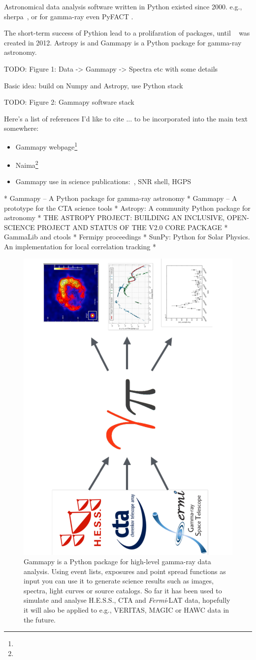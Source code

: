 Astronomical data analysis software written in Python existed since 2000. e.g.,
sherpa~\citep{sherpa-2011, sherpa-2009}, or for gamma-ray even PyFACT
\citep{pyfact}.

The short-term success of Pythion lead to a prolifaration of packages, until
\astropy~\citep{astropy} was created in 2012. Astropy is and Gammapy is a
Python package for gamma-ray astronomy.



TODO: Figure 1: Data -> Gammapy -> Spectra etc with some details

Basic idea: build on Numpy and Astropy, use Python stack

TODO: Figure 2: Gammapy software stack

Here's a list of references I'd like to cite ... to be incorporated into the
main text somewhere:

\begin{itemize}
	\item Gammapy webpage\footnote{\GammapyUrl}
	\item Naima\footnote{\NaimaUrl}~\citep{Naima}
	\item Gammapy use in science publications:~\citep{Owen2015}, SNR shell, HGPS
\end{itemize}

* Gammapy – A Python package for gamma-ray astronomy
* Gammapy – A prototype for the CTA science tools
* Astropy: A community Python package for astronomy
* THE ASTROPY PROJECT: BUILDING AN INCLUSIVE, OPEN-SCIENCE PROJECT AND STATUS
OF THE V2.0 CORE PACKAGE * GammaLib and ctools * Fermipy proceedings * SunPy:
Python for Solar Physics. An implementation for local correlation tracking *

\begin{figure}[t]
	\centering
	\includegraphics[height=0.5\textwidth, angle=270]{static/gammapy-big-picture}
	\caption{
		Gammapy is a Python package for high-level gamma-ray data analysis. Using event
		lists, exposures and point spread functions as input you can use it to generate
		science results such as images, spectra, light curves or source catalogs. So
		far it has been used to simulate and analyse H.E.S.S., CTA and
		\textit{Fermi}-LAT data, hopefully it will also be applied to e.g., VERITAS,
		MAGIC or HAWC data in the future.
	}
	\label{fig:big-picture}
\end{figure}

